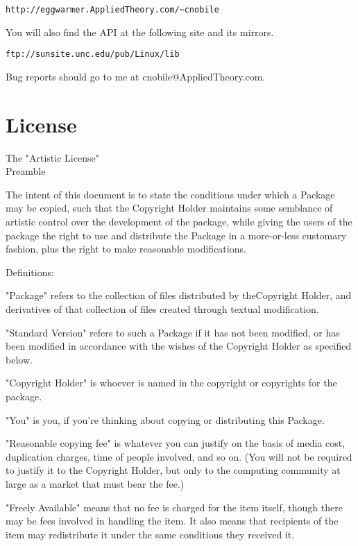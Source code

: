 \documentclass[10pt,letterpaper,titlepage]{article}
\newenvironment{lquote}{\begin{list}{}{}\item[]}{\end{list}}
\begin{document}
\begin{verbatim}
http://eggwarmer.AppliedTheory.com/~cnobile
\end{verbatim}
\vspace{8pt}

\noindent
You will also find the API at the following site and its mirrors.
\vspace{8pt}

\begin{verbatim}
ftp://sunsite.unc.edu/pub/Linux/lib
\end{verbatim}
\vspace{8pt}

\noindent
Bug reports should go to me at cnobile@AppliedTheory.com.
\pagebreak

\section{License}
\begin{center}
\Large			 The "Artistic License"\\
\vspace{8pt}
\Large				Preamble\\
\end{center}
The intent of this document is to state the conditions under which a Package may be copied, such that the Copyright Holder maintains some semblance of artistic control over the development of the package, while giving the users of the package the right to use and distribute the Package in a more-or-less customary fashion, plus the right to make reasonable modifications.
\vspace{8pt}

\noindent
Definitions:
\begin{lquote}
"Package" refers to the collection of files distributed by the\linebreak Copyright Holder, and derivatives of that collection of files created through textual modification.

"Standard Version" refers to such a Package if it has not been modified, or has been modified in accordance with the wishes of the Copyright Holder as specified below.

"Copyright Holder" is whoever is named in the copyright or copyrights for the package.

"You" is you, if you're thinking about copying or distributing this Package.

"Reasonable copying fee" is whatever you can justify on the basis of media cost, duplication charges, time of people involved, and so on.  (You will not be required to justify it to the Copyright Holder, but only to the computing community at large as a market that must bear the fee.)

"Freely Available" means that no fee is charged for the item itself, though there may be fees involved in handling the item.  It also means that recipients of the item may redistribute it under the same conditions they received it.
\end{lquote}
\end{document}
